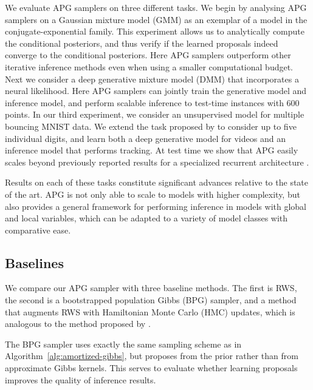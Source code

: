 \documentclass{article}
\theoremstyle{definition}
\begin{document}
We evaluate APG samplers on three different tasks. 
We begin by analysing APG samplers on a Gaussian mixture model (GMM) as an exemplar of a model in the conjugate-exponential family. 
This experiment allows us to analytically compute the conditional posteriors,  and thus verify if the learned proposals indeed converge to the conditional posteriors. 
Here APG samplers outperform other iterative inference methods even when using a smaller computational budget. 
%
Next we consider a deep generative mixture model (DMM) that incorporates a neural likelihood. Here APG samplers can jointly train the generative model and inference model, and perform scalable inference to test-time instances with 600 points. 
In our third experiment, we consider an unsupervised model for multiple bouncing MNIST data. We extend the task proposed by \citet{srivastava2015unsupervised} to consider up to five individual digits, and learn both a deep generative model for videos and an inference model that performs tracking. At test time we show that APG easily scales beyond previously reported results for a specialized recurrent architecture \cite{kosiorek2018sequential}. 

Results on each of these tasks constitute significant advances relative to the state of the art. APG is not only able to scale to models with higher complexity, but also provides a general framework for performing inference in models with global and local variables, which can be adapted to a variety of model classes with comparative ease. 


\subsection{Baselines}
\label{sec:baselines}

We compare our APG sampler with three baseline methods. The first is RWS, the second is a bootstrapped population Gibbs (BPG) sampler, and a method that augments RWS with Hamiltonian Monte Carlo (HMC) updates, which is analogous to the method proposed by \citet{hoffman2017learning}.

The BPG sampler uses exactly the same sampling scheme as in Algorithm~\ref{alg:amortized-gibbs}, but proposes from the prior rather than from  approximate Gibbs kernels. This serves  to evaluate whether learning proposals improves the quality of inference results. 
\end{document}
